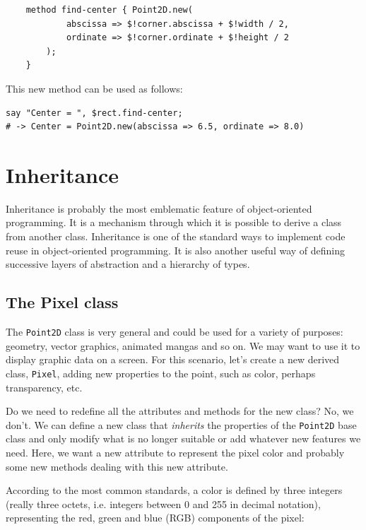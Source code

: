\begin{verbatim}
    method find-center { Point2D.new(
            abscissa => $!corner.abscissa + $!width / 2, 
            ordinate => $!corner.ordinate + $!height / 2
        );
    }
\end{verbatim}
%
This new method can be used as follows:

\begin{verbatim}
say "Center = ", $rect.find-center;
# -> Center = Point2D.new(abscissa => 6.5, ordinate => 8.0)
\end{verbatim}
%

\section{Inheritance}


Inheritance is probably the most emblematic feature of 
object-oriented programming. It is a mechanism through which it 
is possible to derive a class from another class. Inheritance is 
one of the standard ways to implement code reuse in 
object-oriented programming. It is also another useful way of 
defining successive layers of abstraction and a hierarchy of 
types.

\subsection{The Pixel class}

The {\tt Point2D} class is very general and could be used for 
a variety of purposes: geometry, vector graphics, animated mangas 
and so on. We may want to use it to display graphic data on a 
screen. For this scenario, let's create a new derived class, 
{\tt Pixel}, adding new properties to the point, such as color, 
perhaps transparency, etc. 

Do we need to redefine all the attributes and methods for 
the new class? No, we don't. We can define a new class that 
\emph{inherits} the properties of the {\tt Point2D} base class 
and only modify what is no longer suitable or add whatever 
new features we need. Here, we want a new attribute to represent 
the pixel color and probably some new methods dealing with this 
new attribute.

According to the most common standards, a color is defined 
by three integers (really three octets, i.e. integers 
between 0 and 255 in decimal notation), representing the red, 
green and blue (RGB) components of the pixel:

